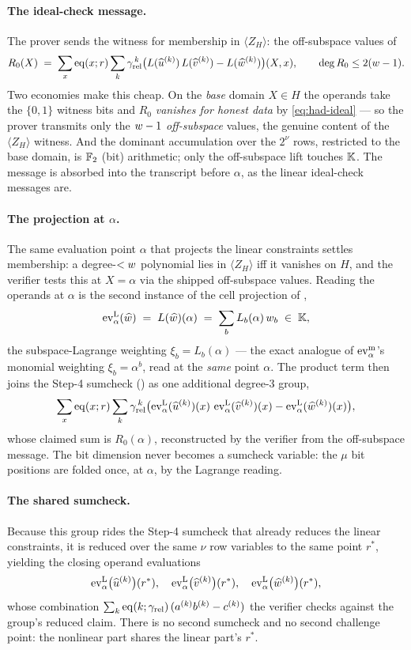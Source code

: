 \paragraph{The ideal-check message.} The prover sends the witness for
membership in $\langle Z_H\rangle$: the off-subspace values of
\[
  R_0(X) \;=\; \sum_{x}\operatorname{eq}(x;r)\sum_k\gamma_{\mathrm{rel}}^{\,k}
  \bigl(L(\widehat{u}^{(k)})\,L(\widehat{v}^{(k)}) - L(\widehat{w}^{(k)})\bigr)(X,x),
  \qquad \deg R_0 \le 2(w-1).
\]
Two economies make this cheap. On the \emph{base} domain $X\in H$ the operands
take the $\{0,1\}$ witness bits and $R_0$ \emph{vanishes for honest data} by
\eqref{eq:had-ideal} --- so the prover transmits only the $w-1$
\emph{off-subspace} values, the genuine content of the $\langle Z_H\rangle$
witness. And the dominant accumulation over the $2^{\nu}$ rows, restricted to
the base domain, is $\mathbb{F}_2$ (bit) arithmetic; only the off-subspace lift
touches $\mathbb{K}$. The message is absorbed into the transcript before $\alpha$, as
the linear ideal-check messages are.

\paragraph{The projection at $\alpha$.} The same evaluation point $\alpha$
that projects the linear constraints settles membership: a degree-$<w$
polynomial lies in $\langle Z_H\rangle$ iff it vanishes on $H$, and the
verifier tests this at $X=\alpha$ via the shipped off-subspace values. Reading
the operands at $\alpha$ is the second instance of the cell projection of
,
\[
  \operatorname{ev}^{\mathrm{L}}_{\alpha}(\widehat{w}) \;=\; L(\widehat{w})(\alpha) \;=\; \sum_b L_b(\alpha)\,w_b \;\in\;\mathbb{K} ,
\]
the subspace-Lagrange weighting $\xi_b=L_b(\alpha)$ --- the exact analogue of
$\operatorname{ev}^{\mathrm{m}}_{\alpha}$'s monomial weighting $\xi_b=\alpha^b$, read at the \emph{same} point
$\alpha$. The product term then joins the Step-4 sumcheck
() as one additional degree-$3$ group,
\[
  \sum_{x}\operatorname{eq}(x;r)\sum_k\gamma_{\mathrm{rel}}^{\,k}
  \bigl(\operatorname{ev}^{\mathrm{L}}_{\alpha}(\widehat{u}^{(k)})(x)\,\operatorname{ev}^{\mathrm{L}}_{\alpha}(\widehat{v}^{(k)})(x) - \operatorname{ev}^{\mathrm{L}}_{\alpha}(\widehat{w}^{(k)})(x)\bigr),
\]
whose claimed sum is $R_0(\alpha)$, reconstructed by the verifier from the
off-subspace message. The bit dimension never becomes a sumcheck variable: the
$\mu$ bit positions are folded once, at $\alpha$, by the Lagrange reading.

\paragraph{The shared sumcheck.} Because this group rides the Step-4 sumcheck
that already reduces the linear constraints, it is reduced over the same $\nu$
row variables to the same point $r^*$, yielding the closing operand
evaluations
\begin{equation}
  \label{eq:operand-evals}
  \operatorname{ev}^{\mathrm{L}}_{\alpha}\bigl(\widehat{u}^{(k)}\bigr)(r^*),\quad
  \operatorname{ev}^{\mathrm{L}}_{\alpha}\bigl(\widehat{v}^{(k)}\bigr)(r^*),\quad
  \operatorname{ev}^{\mathrm{L}}_{\alpha}\bigl(\widehat{w}^{(k)}\bigr)(r^*),
\end{equation}
whose combination $\sum_k\operatorname{eq}(k;\gamma_{\mathrm{rel}})\,(a^{(k)}b^{(k)}-c^{(k)})$
the verifier checks against the group's reduced claim. There is no second
sumcheck and no second challenge point: the nonlinear part shares the linear
part's $r^*$.

